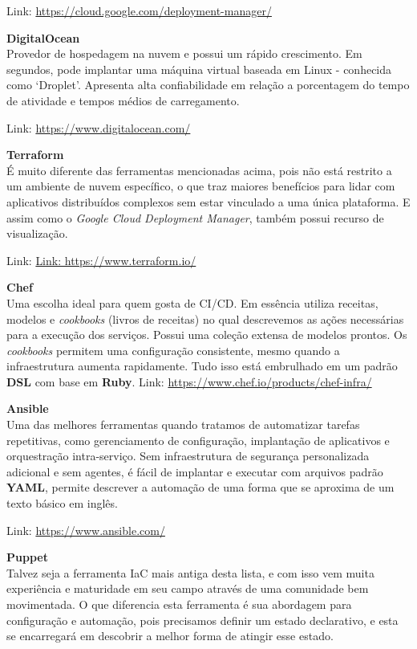 \documentclass[fleqn,10pt]{SelfArx} %
\begin{document}
Link: \url{https://cloud.google.com/deployment-manager/}

\textbf{DigitalOcean} \\
Provedor de hospedagem na nuvem e possui um rápido crescimento. Em segundos, pode implantar uma máquina virtual baseada em Linux - conhecida como ‘Droplet’. Apresenta alta confiabilidade em relação a porcentagem do tempo de atividade e tempos médios de carregamento.

Link: \url{https://www.digitalocean.com/}

\textbf{Terraform} \\
É muito diferente das ferramentas mencionadas acima, pois não está restrito a um ambiente de nuvem específico, o que traz maiores benefícios para lidar com aplicativos distribuídos complexos sem estar vinculado a uma única plataforma. E assim como o \textit{Google Cloud Deployment Manager}, também possui recurso de visualização.

Link: \url{Link: https://www.terraform.io/}

\textbf{Chef} \\
Uma escolha ideal para quem gosta de CI/CD. Em essência utiliza receitas, modelos e \textit{cookbooks} (livros de receitas) no qual descrevemos as ações necessárias para a execução dos serviços. Possui uma coleção extensa de modelos prontos. Os \textit{cookbooks} permitem uma configuração consistente, mesmo quando a infraestrutura aumenta rapidamente. Tudo isso está embrulhado em um padrão \textbf{DSL} com base em \textbf{Ruby}.
Link: \url{https://www.chef.io/products/chef-infra/}

\textbf{Ansible} \\
Uma das melhores ferramentas quando tratamos de automatizar tarefas repetitivas, como gerenciamento de configuração, implantação de aplicativos e orquestração intra-serviço. Sem infraestrutura de segurança personalizada adicional e sem agentes, é fácil de implantar e executar com arquivos padrão \textbf{YAML}, permite descrever a automação de uma forma que se aproxima de um texto básico em inglês.

Link: \url{https://www.ansible.com/}

\textbf{Puppet} \\
Talvez seja a ferramenta IaC mais antiga desta lista, e com isso vem muita experiência e maturidade em seu campo através de uma comunidade bem movimentada. O que diferencia esta ferramenta é sua abordagem para configuração e automação, pois precisamos definir um estado declarativo, e esta se encarregará em descobrir a melhor forma de atingir esse estado.
\end{document}
